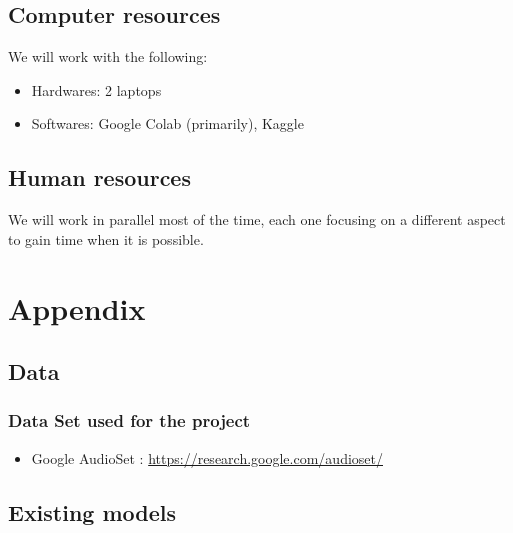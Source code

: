 \documentclass[11pt]{article}
\begin{document}
\subsection{Computer resources}

We will work with the following:
\begin{itemize}
  \item Hardwares: 2 laptops
  \item Softwares: Google Colab (primarily), Kaggle
\end{itemize}

\subsection{Human resources}

We will work in parallel most of the time, each one focusing on a different aspect to gain time when it is possible.

\pagebreak

\section{Appendix}

\subsection{Data}

\subsubsection*{Data Set used for the project}

\begin{itemize}
  \item Google AudioSet : \url{https://research.google.com/audioset/}
        \label{item:google-audioset}
\end{itemize}

\subsection{Existing models}
\end{document}
